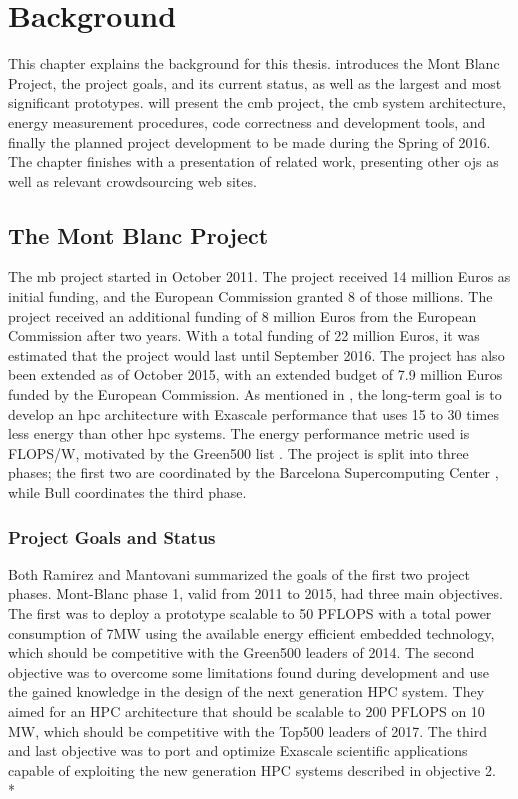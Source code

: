 \chapter{Background}
\label{ch:background}
This chapter explains the background for this thesis.  introduces the Mont Blanc Project, the project goals, and its current status, as well as the largest and most significant prototypes.  will present the \gls{cmb} project, the \gls{cmb} system architecture, energy measurement procedures, code correctness and development tools, and finally the planned project development to be made during the Spring of 2016. The chapter finishes with a presentation of related work, presenting other \glspl{oj} as well as relevant crowdsourcing web sites.

\section{The Mont Blanc Project}
\label{sec:mbp}
The \gls{mb} project \cite{MB} started in October 2011. The project received 14 million Euros as initial funding, and the European Commission granted 8 of those millions. The project received an additional funding of 8 million Euros from the European Commission after two years. With a total funding of 22 million Euros, it was estimated that the project would last until September 2016. The project has also been extended as of October 2015, with an extended budget of 7.9 million Euros funded by the European Commission. As mentioned in , the long-term goal is to develop an \gls{hpc} architecture with Exascale performance that uses 15 to 30 times less energy than other \gls{hpc} systems. The energy performance metric used is FLOPS/W, motivated by the Green500 list \cite{GREEN500}. The project is split into three phases; the first two are coordinated by the Barcelona Supercomputing Center \cite{BSC}, while Bull \cite{BULL} coordinates the third phase.

\subsection{Project Goals and Status}
Both Ramirez \cite{p:MB-PRACE-14} and Mantovani \cite{p:MB-15} summarized the goals of the first two project phases. Mont-Blanc phase 1, valid from 2011 to 2015, had three main objectives. The first was to deploy a prototype scalable to 50 PFLOPS with a total power consumption of 7MW using the available energy efficient embedded technology, which should be competitive with the Green500 leaders of 2014. The second objective was to overcome some limitations found during development and use the gained knowledge in the design of the next generation HPC system. They aimed for an HPC architecture that should be scalable to 200 PFLOPS on 10 MW, which should be competitive with the Top500 leaders of 2017. The third and last objective was to port and optimize Exascale scientific applications capable of exploiting the new generation HPC systems described in objective 2. \\*

